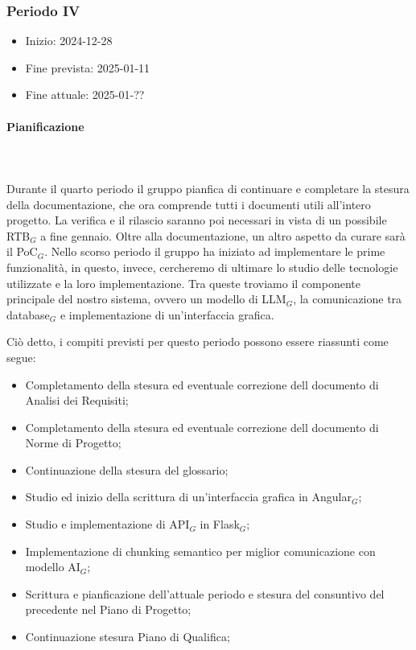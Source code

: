 \subsubsection{Periodo IV}

\begin{itemize}
    \item Inizio: 2024-12-28
    \item Fine prevista: 2025-01-11
    \item Fine attuale: 2025-01-??
\end{itemize}
\paragraph{Pianificazione} \hspace{1cm}
\\ \hspace{1cm} \\
Durante il quarto periodo il gruppo pianfica di continuare e completare la stesura della documentazione, che ora comprende tutti i documenti utili all'intero progetto. La verifica e il rilascio saranno poi necessari in vista di un possibile RTB$_G$ a fine gennaio. Oltre alla documentazione, un altro aspetto da curare sarà il PoC$_G$. Nello scorso periodo il gruppo ha iniziato ad implementare le prime funzionalità, in questo, invece, cercheremo di ultimare lo studio delle tecnologie utilizzate e la loro implementazione. Tra queste troviamo il componente principale del nostro sistema, ovvero un modello di LLM$_G$, la comunicazione tra database$_G$ e implementazione di un'interfaccia grafica. 

Ciò detto, i compiti previsti per questo periodo possono essere riassunti come segue:  
\begin{itemize}
    \item Completamento della stesura ed eventuale correzione dell documento di Analisi dei Requisiti;
    \item Completamento della stesura ed eventuale correzione dell documento di Norme di Progetto;
    \item Continuazione della stesura del glossario;
    \item Studio ed inizio della scrittura di un'interfaccia grafica in Angular$_G$;
    \item Studio e implementazione di API$_G$ in Flask$_G$;
    \item Implementazione di chunking semantico per miglior comunicazione con modello AI$_G$;
    \item Scrittura e pianficazione  dell'attuale periodo e stesura del consuntivo del precedente nel Piano di Progetto;
    \item Continuazione stesura Piano di Qualifica;
\end{itemize}

